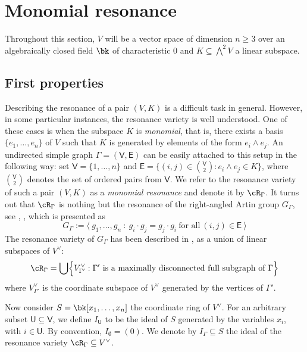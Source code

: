 \documentclass[10pt, leqno]{amsart}
\begin{document}
\section{Monomial resonance}

Throughout this section, $V$ will be a vector space of dimension $n\ge 3$ over an algebraically closed field $\bk$ of characteristic $0$ and $K \subseteq \bigwedge^2V$ a linear subspace.

\subsection{First properties}

Describing the resonance of a pair $(V,K)$ is a difficult task in general. However, in some particular instances, the resonance variety is well understood. One of these cases is when the subspace $K$ is \emph{monomial}, that is, there exists a basis $\{e_1,\ldots, e_n\}$ of $V$ such that $K$ is generated by elements of the form $e_i \wedge e_j$. An undirected simple graph $\Gamma = (\mathsf{V}, \mathsf{E})$ can be easily attached to this setup in the following way: set $\mathsf{V} = \{1, \ldots, n\}$ and $\mathsf{E} = \{(i,j)\in \binom{\mathsf{V}}{2} : e_i \wedge e_j \in K \}$, where $\binom{\mathsf{V}}{2}$ denotes the set of ordered pairs from $\mathsf{V}$. We refer to the resonance variety of such a pair $(V,K)$ as a \emph{monomial resonance} and denote it by $\cR_\Gamma$. It turns out that $\cR_\Gamma$ is nothing but the resonance of the right-angled Artin group $G_\Gamma$, see \cite{papadima_2006}, \cite[Section 8]{aprodu_reduced_2024}, which is presented as
\[
G_\Gamma :=  \langle\ g_1, \ldots, g_n \ : \ g_i \cdot g_j = g_j \cdot g_i \ \text{for all} \ (i,j)\in \mathsf{E} \ \rangle
\]
The resonance variety of $G_\Gamma$ has been described in \cite[Theorem 5.5]{papadima_2006}, as a union of linear subspaces of $V^\vee$:
\begin{equation} \label{eq:res_coordinate}
\cR_\Gamma = \bigcup \Bigl\{V^\vee_{\Gamma'} : \Gamma' \ \text{is a maximally disconnected full subgraph of}\ \Gamma \Bigr\}   
\end{equation}
where $V^\vee_{\Gamma'}$ is the coordinate subspace of $V^\vee$ generated by the vertices of $\Gamma'$.

Now consider $S = \bk[x_1, \ldots, x_n]$ the coordinate ring of $V^\vee$. For an arbitrary subset $\mathsf{U} \subseteq \mathsf{V}$, we define $I_{\mathsf{U}}$ to be the ideal of $S$ generated by the variables $x_i$, with $i\in \mathsf{U}$. By convention, $I_\emptyset = (0)$. We denote by $I_\Gamma \subseteq S$ the ideal of the resonance variety $\cR_\Gamma \subseteq V^\vee$. 
\end{document}

